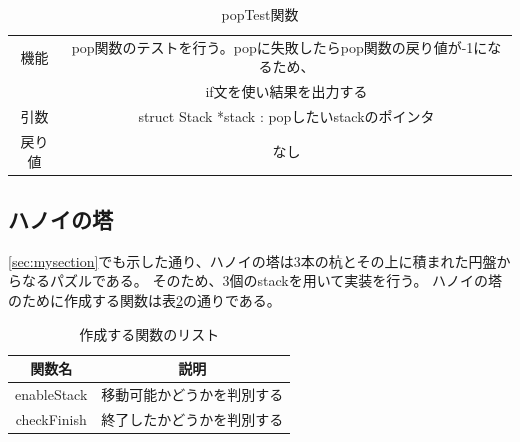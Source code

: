 \documentclass[dvipdfmx]{jsarticle}
\begin{document}
\begin{table}[ht]
  \centering
  \begin{tabular}{|c|c|}
    \hline
    機能  & pop関数のテストを行う。popに失敗したらpop関数の戻り値が-1になるため、 \\ & if文を使い結果を出力する            \\
    \hline
    引数  & struct Stack *stack : popしたいstackのポインタ   \\
    \hline
    戻り値 & なし                                       \\
    \hline
  \end{tabular}
  \caption{popTest関数}
  \label{tab:poptest_func}
\end{table}
\newpage
\subsection{ハノイの塔}
\ref{sec:mysection}でも示した通り、ハノイの塔は3本の杭とその上に積まれた円盤からなるパズルである。
そのため、3個のstackを用いて実装を行う。
ハノイの塔のために作成する関数は表\ref{tab:hanoi_functions}の通りである。
\begin{table}[ht]
  \centering
  \begin{tabular}{|c|c|}
    \hline
    \textbf{関数名} & \textbf{説明}   \\
    \hline
    enableStack  & 移動可能かどうかを判別する \\
    \hline
    checkFinish  & 終了したかどうかを判別する \\
    \hline
  \end{tabular}
  \caption{作成する関数のリスト}
  \label{tab:hanoi_functions}
\end{table}
\end{document}
